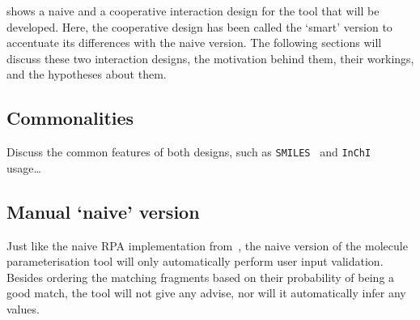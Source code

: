  shows a naive and a cooperative interaction design for the tool that will be developed. Here, the cooperative design has been called the `smart' version to accentuate its differences with the naive version. The following sections will discuss these two interaction designs, the motivation behind them, their workings, and the hypotheses about them.

\subsection{Commonalities}
Discuss the common features of both designs, such as \verb|SMILES|~\cite{daylight1992daylight} and \verb|InChI|~\cite{heller2013inchi} usage\ldots

\nlipsum

\subsection{Manual `naive' version}
Just like the naive RPA implementation from~\cite{payne2000varying}, the naive version of the molecule parameterisation tool will only automatically perform user input validation. Besides ordering the matching fragments based on their probability of being a good match, the tool will not give any advise, nor will it automatically infer any values.

